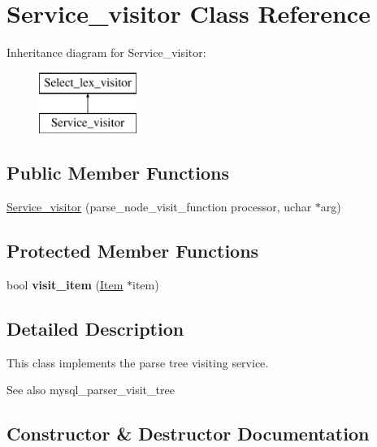\hypertarget{classService__visitor}{}\section{Service\+\_\+visitor Class Reference}
\label{classService__visitor}
Inheritance diagram for Service\+\_\+visitor\+:\begin{figure}[H]
\begin{center}
\leavevmode
\includegraphics[height=2.000000cm]{classService__visitor}
\end{center}
\end{figure}
\subsection*{Public Member Functions}
\begin{DoxyCompactItemize}
\item 
\mbox{\hyperlink{classService__visitor_a6da35731c78ae07c258f483952ba766a}{Service\+\_\+visitor}} (parse\+\_\+node\+\_\+visit\+\_\+function processor, uchar $\ast$arg)
\end{DoxyCompactItemize}
\subsection*{Protected Member Functions}
\begin{DoxyCompactItemize}
\item 
\mbox{\label{classService__visitor_ad211cb379177c9fa735eb63d72aa2c82}} 
bool {\bfseries visit\+\_\+item} (\mbox{\hyperlink{classItem}{Item}} $\ast$item)
\end{DoxyCompactItemize}


\subsection{Detailed Description}
This class implements the parse tree visiting service. \begin{DoxySeeAlso}{See also}
mysql\+\_\+parser\+\_\+visit\+\_\+tree 
\end{DoxySeeAlso}


\subsection{Constructor \& Destructor Documentation}
\mbox{\label{classService__visitor_a6da35731c78ae07c258f483952ba766a}} 
